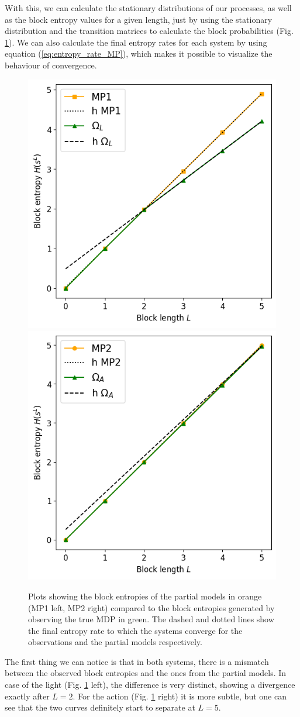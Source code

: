 \documentclass[12pt,a4paper]{article}
\begin{document}
With this, we can calculate the stationary distributions of our processes, as well as the block entropy values for a given length, just by using the stationary distribution and the transition matrices to calculate the block probabilities (Fig. \ref{fig:block_curves}).
We can also calculate the final entropy rates for each system by using equation (\ref{eq:entropy_rate_MP}), which makes it possible to visualize the behaviour of convergence.

\begin{figure}[H]
    \centering
    \includegraphics[width=0.49\linewidth]{../figures/mp1_obs_L_thesis.png}
    \includegraphics[width=0.49\linewidth]{../figures/mp2_obs_A_thesis.png}
    \caption{\label{fig:block_curves}Plots showing the block entropies of the partial models in orange (MP1 left, MP2 right) compared to the block entropies generated by observing the true MDP in green. The dashed and dotted lines show the final entropy rate to which the systems converge for the observations and the partial models respectively.}
\end{figure}

The first thing we can notice is that in both systems, there is a mismatch between the observed block entropies and the ones from the partial models.
In case of the light (Fig. \ref{fig:block_curves} left), the difference is very distinct, showing a divergence exactly after $L=2$.
For the action (Fig. \ref{fig:block_curves} right) it is more subtle, but one can see that the two curves definitely start to separate at $L=5$.
\end{document}
